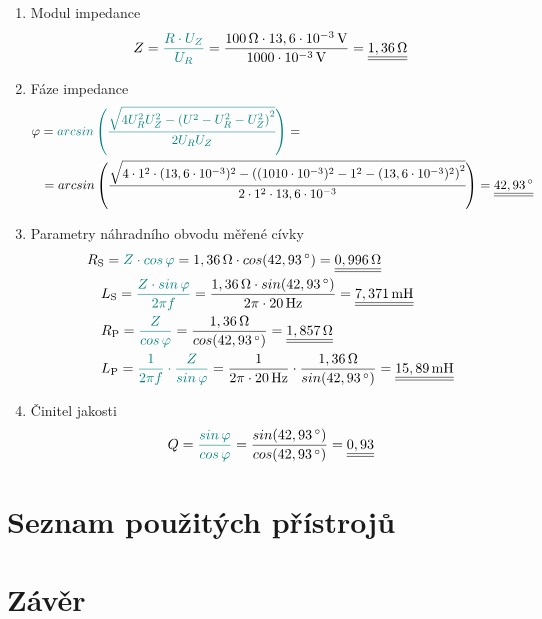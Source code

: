 \documentclass[a4paper, czech]{article}
\begin{document}
\begin{enumerate}
    \item Modul impedance
    \begin{multline*}
        Z = \textcolor{teal}{\frac{R \cdot U_Z}{U_R}} = \frac{100\,\Omega \cdot 13,6 \cdot 10^{-3}\,\text{V}}{1000 \cdot 10^{-3}\,\text{V}} = \underline{\underline{1,36\,\Omega}} \hfill
    \end{multline*}
    \item Fáze impedance
    \begin{multline*}
        \varphi = \textcolor{teal}{arcsin \left(\cfrac{\sqrt{4 U^2_R U^2_Z - \left(U^2 - U^2_R - U^2_Z\right)^2}}{2 U_R U_Z}\right)} = \hfill \\
        \ \ \ = arcsin \left(\cfrac{\sqrt{4 \cdot 1^2 \cdot (13,6 \cdot 10^{-3})^2 - \left((1010 \cdot 10^{-3})^2 - 1^2 - (13,6 \cdot 10^{-3})^2\right)^2}}{2 \cdot 1^2 \cdot 13,6 \cdot 10^{-3}}\right) =
        \underline{\underline{42,93\,\degree}} \hfill
    \end{multline*}
    \item Parametry náhradního obvodu měřené cívky
    \begin{multline*}
        R_\text{S} = \textcolor{teal}{Z \cdot cos\,\varphi} = 1,36\,\Omega \cdot cos (42,93\,\degree) = \underline{\underline{0,996\,\Omega}} \hfill \\
        \ \ \ L_\text{S} = \textcolor{teal}{\frac{Z \cdot sin\,\varphi}{2 \pi f}} = \frac{1,36\,\Omega \cdot sin(42,93\,\degree)}{2 \pi \cdot 20\,\text{Hz}} = \underline{\underline{7,371\,\text{mH}}} \hfill \\
        \ \ \ R_\text{P} = \textcolor{teal}{\frac{Z}{cos\,\varphi}} = \frac{1,36\,\Omega}{cos (42,93\,\degree)} = \underline{\underline{1,857\,\Omega}} \hfill \\
        \ \ \ L_\text{P} = \textcolor{teal}{\frac{1}{2 \pi f} \cdot \frac{Z}{sin\,\varphi}} = \frac{1}{2 \pi \cdot 20\,\text{Hz}} \cdot \frac{1,36\,\Omega}{sin(42,93\,\degree)} = \underline{\underline{15,89\,\text{mH}}} \hfill
    \end{multline*}
    \item Činitel jakosti
    \begin{multline*}
        Q = \textcolor{teal}{\frac{sin\,\varphi}{cos\,\varphi}} = \frac{sin(42,93\,\degree)}{cos(42,93\,\degree)} = \underline{\underline{0,93}} \hfill
    \end{multline*}
\end{enumerate}

\section{Seznam použitých přístrojů}

\section{Závěr}
\end{document}
